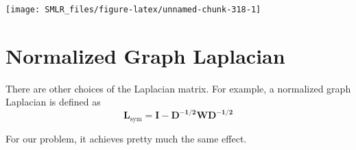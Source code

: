 \documentclass[
]{book}
\newenvironment{Shaded}{\begin{snugshade}}{\end{snugshade}}
\newcommand{\AttributeTok}[1]{\textcolor[rgb]{0.13,0.29,0.53}{#1}}
\newcommand{\DecValTok}[1]{\textcolor[rgb]{0.00,0.00,0.81}{#1}}
\newcommand{\FunctionTok}[1]{\textcolor[rgb]{0.13,0.29,0.53}{\textbf{#1}}}
\newcommand{\NormalTok}[1]{#1}
\newcommand{\OtherTok}[1]{\textcolor[rgb]{0.56,0.35,0.01}{#1}}
\newcommand{\SpecialCharTok}[1]{\textcolor[rgb]{0.81,0.36,0.00}{\textbf{#1}}}
\theoremstyle{definition}
\theoremstyle{definition}
\theoremstyle{definition}
\theoremstyle{definition}
\theoremstyle{remark}
\begin{document}
\begin{Shaded}
\end{Shaded}

\begin{center}\texttt{[image: SMLR\_files/figure-latex/unnamed-chunk-318-1]} \end{center}

\hypertarget{normalized-graph-laplacian}{%
\section{Normalized Graph Laplacian}\label{normalized-graph-laplacian}}

There are other choices of the Laplacian matrix. For example, a normalized graph Laplacian is defined as
\[\mathbf{L}_\text{sym} = \mathbf{I} - \mathbf{D^{-1/2} \mathbf{W} D^{-1/2}}\]

For our problem, it achieves pretty much the same effect.
\end{document}
